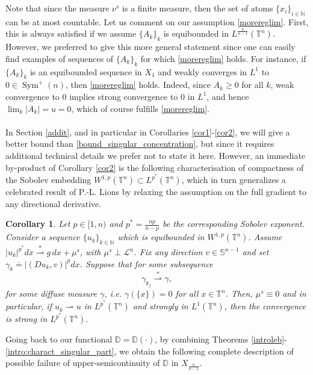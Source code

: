 \documentclass[10pt,reqno]{amsart}
\numberwithin{equation}{section}
\newcommand{\weak}{\overset{*}{\rightharpoonup}}
\newcommand{\T}{\mathbb{T}}
\newcommand{\N}{\mathbb{N}}
\newcommand{\D}{\mathbb{D}}
\DeclareMathOperator{\Sym}{Sym}
\theoremstyle{plain}
\newtheorem{Cor}[Teo]{Corollary}
\theoremstyle{definition}
\theoremstyle{remark}
\begin{document}
Note that since the measure $\nu^s$ is a finite measure, then the set of atoms $\{x_i\}_{i\in\N}$ can be at most countable.  Let us comment on our assumption \eqref{morereglim}. First, this is always satisfied if we assume $\{A_k\}_k$ is equibounded in $L^\frac{n}{n - 1}(\T^n)$. However, we preferred to give this more general statement since one can easily find examples of sequences of $\{A_k\}_k$ for which \eqref{morereglim} holds. For instance, if $\{A_k\}_k$ is an equibounded sequence in $X_1$ and weakly converges in $L^1$ to $0 \in \Sym^+(n)$, then \eqref{morereglim} holds. Indeed, since $A_k \ge 0$ for all $k$, weak convergence to $0$ implies strong convergence to $0$ in $L^1$, and hence $\lim_k|A_k| = u = 0$, which of course fulfills \eqref{morereglim}. 
\\
\\
In Section \ref{addit}, and in particular in Corollaries \ref{cor1}-\ref{cor2},  we will give a better bound than  \eqref{bound_singular_concentration}, but since it requires additional technical details we prefer not to state it here. However, an immediate by-product of Corollary \ref{cor2} is the following characterisation of compactness of the Sobolev embedding  $W^{1,p}(\T^n)\subset L^{p^*}(\T^n)$, which in turn generalizes a celebrated result of P.-L. Lions \cite{PLL3,PLL4} by relaxing the assumption on the full gradient to any directional derivative. 
\begin{Cor}\label{cor3}
Let $p \in [1,n)$ and $p^*=\frac{np}{n-p}$ be the corresponding Sobolev exponent. Consider a sequence $\{u_k\}_{k \in \N}$ which is equibounded in $W^{1,p}(\T^n)$. Assume $|u_k|^{p^*}dx \weak g\,dx + \mu^s$, with $\mu^s \perp \mathcal{L}^n$. Fix any direction $v \in \mathbb{S}^{n-1}$ and set $\gamma_k \doteq |(Du_{k},v)|^pdx$. Suppose that for some subsequence
\begin{equation}\label{dirder}
\gamma_{k_j} \weak \gamma,
\end{equation}
for some diffuse measure $\gamma$, i.e. $\gamma(\{x\}) = 0$ for all $x \in \T^n$. Then, $\mu^s \equiv 0$ and in particular, if $u_k \rightharpoonup u$ in $L^{p^*}(\T^n)$ and strongly in $L^1(\T^n)$, then the convergence is strong in $L^{p^*}(\T^n)$.
\end{Cor}
Going back to our functional $\D=\D(\cdot)$, by combining Theorems \ref{introleb}-\ref{intro:charact_singular_part}, we obtain the following complete description of possible failure of upper-semicontinuity of $\D$ in $X_{\frac{n}{n-1}}$.
\end{document}
